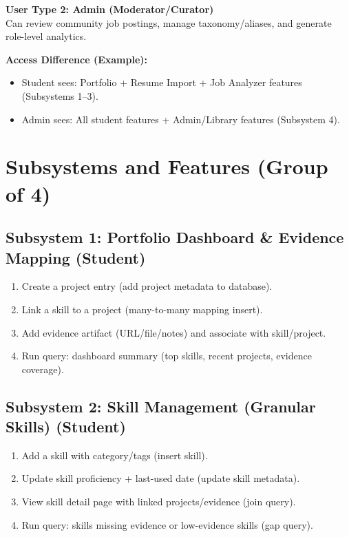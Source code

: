 \documentclass[11pt]{article}
\begin{document}
\textbf{User Type 2: Admin (Moderator/Curator)} \\
Can review community job postings, manage taxonomy/aliases, and generate role-level analytics.

\vspace{0.2cm}
\textbf{Access Difference (Example):}
\begin{itemize}[leftmargin=*]
  \item Student sees: Portfolio + Resume Import + Job Analyzer features (Subsystems 1--3).
  \item Admin sees: All student features + Admin/Library features (Subsystem 4).
\end{itemize}

\section{Subsystems and Features (Group of 4)} %

\subsection{Subsystem 1: Portfolio Dashboard \& Evidence Mapping (Student)}
\begin{enumerate}[leftmargin=*]
  \item Create a project entry (add project metadata to database).
  \item Link a skill to a project (many-to-many mapping insert).
  \item Add evidence artifact (URL/file/notes) and associate with skill/project.
  \item Run query: dashboard summary (top skills, recent projects, evidence coverage).
\end{enumerate}

\subsection{Subsystem 2: Skill Management (Granular Skills) (Student)}
\begin{enumerate}[leftmargin=*]
  \item Add a skill with category/tags (insert skill).
  \item Update skill proficiency + last-used date (update skill metadata).
  \item View skill detail page with linked projects/evidence (join query).
  \item Run query: skills missing evidence or low-evidence skills (gap query).
\end{enumerate}
\end{document}
